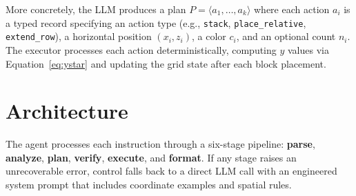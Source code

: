 \documentclass{article}
\begin{document}
More concretely, the LLM produces a plan $P = \langle a_1, \ldots, a_k \rangle$
where each action $a_i$ is a typed record specifying an action type
(e.g., \texttt{stack}, \texttt{place\_relative}, \texttt{extend\_row}),
a horizontal position $(x_i, z_i)$, a color $c_i$, and an optional count
$n_i$. The executor processes each action deterministically, computing $y$
values via Equation~\ref{eq:ystar} and updating the grid state after each
block placement.

\section{Architecture}

The agent processes each instruction through a six-stage pipeline:
\textbf{parse}, \textbf{analyze}, \textbf{plan}, \textbf{verify},
\textbf{execute}, and \textbf{format}. If any stage raises an unrecoverable
error, control falls back to a direct LLM call with an engineered system
prompt that includes coordinate examples and spatial rules.
\end{document}
